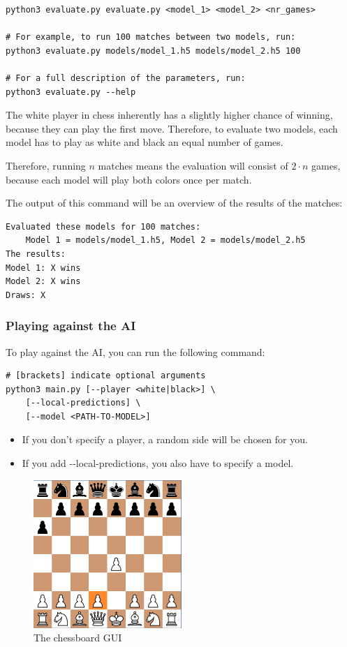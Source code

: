 \documentclass{article}
\begin{document}
\begin{verbatim}
python3 evaluate.py evaluate.py <model_1> <model_2> <nr_games>

# For example, to run 100 matches between two models, run:
python3 evaluate.py models/model_1.h5 models/model_2.h5 100

# For a full description of the parameters, run:
python3 evaluate.py --help
\end{verbatim}

The white player in chess inherently has a slightly higher chance of winning,
because they can play the first move. Therefore, to evaluate two models, 
each model has to play as white and black an equal number of games.

Therefore, running $n$ matches means the evaluation will consist of $2\cdot n$ games, because
each model will play both colors once per match.

The output of this command will be an overview of the results of the matches:

\begin{verbatim}
Evaluated these models for 100 matches: 
    Model 1 = models/model_1.h5, Model 2 = models/model_2.h5 
The results: 
Model 1: X wins
Model 2: X wins
Draws: X
\end{verbatim}

\subsubsection{Playing against the AI}

To play against the AI, you can run the following command:

\begin{verbatim}
# [brackets] indicate optional arguments
python3 main.py [--player <white|black>] \
    [--local-predictions] \
    [--model <PATH-TO-MODEL>]
\end{verbatim}


\begin{itemize}
    \item If you don't specify a player, a random side will be chosen for you.
    \item If you add -{}-local-predictions, you also have to specify a model.
\end{itemize}

\begin{figure}[H]
    \centering
    \includegraphics[width=0.5\textwidth]{img/chessboard-gui.png}
    \caption{The chessboard GUI}
\end{figure}
\end{document}
